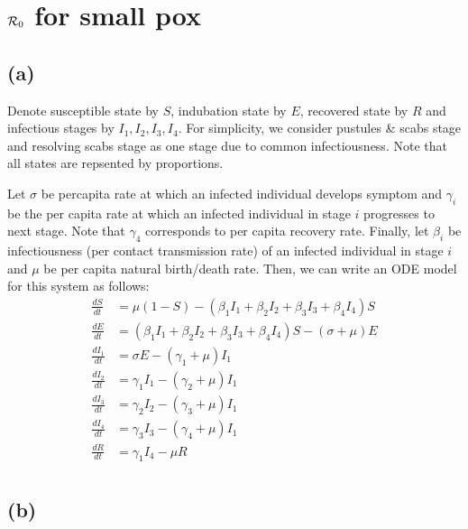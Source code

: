\documentclass{article}
\begin{document}
\section{${\cal R}_0$ for small pox}

\subsection*{(a)}

Denote susceptible state by $S$, indubation state by $E$, recovered state by $R$ and infectious stages by $I_1, I_2, I_3, I_4$. For simplicity, we consider pustules \& scabs stage and resolving scabs stage as one stage due to common infectiousness.
Note that all states are repsented by proportions.

Let $\sigma$ be percapita rate at which an infected individual develops symptom and $\gamma_i$ be the per capita rate at which an infected individual in stage $i$ progresses to next stage. Note that $\gamma_4$ corresponds to per capita recovery rate. 
Finally, let $\beta_i$ be infectiousness (per contact transmission rate) of an infected individual in stage $i$ and $\mu$ be per capita natural birth/death rate. Then, we can write an ODE model for this system as follows:
$$
\begin{aligned}
\frac{dS}{dt} &= \mu (1-S) - (\beta_1 I_1 + \beta_2 I_2 + \beta_3 I_3 + \beta_4 I_4) S\\
\frac{dE}{dt} &= (\beta_1 I_1 + \beta_2 I_2 + \beta_3 I_3 + \beta_4 I_4) S - (\sigma + \mu) E \\
\frac{dI_1}{dt} &= \sigma E - (\gamma_1 + \mu) I_1\\
\frac{dI_2}{dt} &= \gamma_1 I_1 - (\gamma_2 + \mu) I_1\\
\frac{dI_3}{dt} &= \gamma_2 I_2 - (\gamma_3 + \mu) I_1\\
\frac{dI_4}{dt} &= \gamma_3 I_3 - (\gamma_4 + \mu) I_1\\
\frac{dR}{dt} &= \gamma_1 I_4 - \mu R\\
\end{aligned}
$$

\subsection*{(b)}
\end{document}
